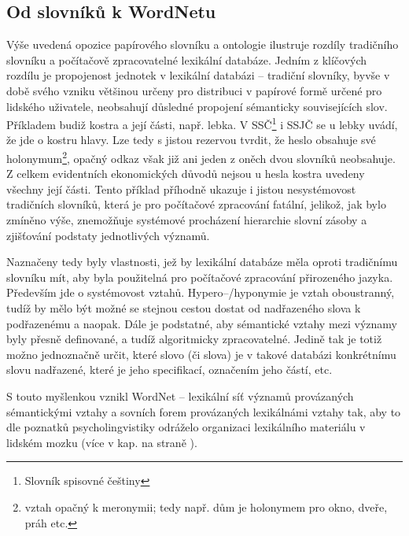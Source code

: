 \documentclass[a4paper, 11pt, oneside]{book}
\newcommand{\td}[2][]{
	{\hskip -0.5em\todo[size=\footnotesize]{#2}}
}
\newcommand{\itNameRef}[1]{\textit{\nameref{#1}}}
\newcommand\ex{\textsf}
\begin{document}
				\subsection{Od slovníků k WordNetu}

					Výše uvedená opozice papírového slovníku a ontologie ilustruje rozdíly tradičního slovníku a počítačově zpracovatelné lexikální databáze. Jedním z klíčových rozdílu je propojenost jednotek v lexikální databázi -- tradiční slovníky, byvše v době svého vzniku většinou určeny pro distribuci v papírové formě určené pro lidského uživatele, neobsahují důsledné propojení sémanticky souvisejících slov. Příkladem budiž \ex{kostra} a její části, např. \ex{lebka}. V SSČ\footnote{Slovník spisovné češtiny} i SSJČ se u \ex{lebky} uvádí, že jde o \ex{kostru hlavy}. Lze tedy s jistou rezervou tvrdit, že heslo obsahuje své holonymum\footnote{vztah opačný k meronymii; tedy např. \ex{dům} je holonymem pro \ex{okno}, \ex{dveře}, \ex{práh} etc.}, opačný odkaz však již ani jeden z oněch dvou slovníků neobsahuje. Z celkem evidentních ekonomických důvodů nejsou u hesla \ex{kostra} uvedeny všechny její části. Tento příklad příhodně ukazuje i jistou nesystémovost tradičních slovníků, která je pro počítačové zpracování fatální, jelikož, jak bylo zmíněno výše, znemožňuje systémové procházení hierarchie slovní zásoby a zjišťování podstaty jednotlivých významů.

					Naznačeny tedy byly vlastnosti, jež by lexikální databáze měla oproti tradičnímu slovníku mít, aby byla použitelná pro počítačové zpracování přirozeného jazyka. Především jde o systémovost vztahů. Hypero--/hyponymie je vztah oboustranný, tudíž by mělo být možné se stejnou cestou dostat od nadřazeného slova k podřazenému a naopak. Dále je podstatné, aby sémantické vztahy mezi významy byly přesně definované, a tudíž algoritmicky zpracovatelné. Jedině tak je totiž možno jednoznačně určit, které slovo (či slova) je v takové databázi konkrétnímu slovu nadřazené, které je jeho specifikací, označením jeho částí, etc. 

					S touto myšlenkou vznikl WordNet -- lexikální síť významů provázaných sémantickými vztahy a sovních forem provázaných lexikálnámi vztahy tak, aby to dle poznatků psycholingvistiky odráželo organizaci lexikálního materiálu v lidském mozku (více v kap. \itNameRef{cha:psycho} na straně \pageref{cha:psycho}). \parencite{pala2013vceska} 

\end{document}
